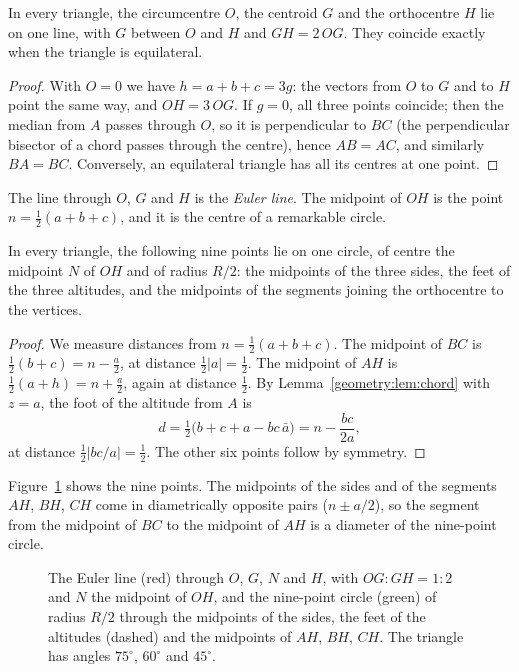 \begin{theorem}[Euler, 1765]\label{geometry:thm:eulerline}
In every triangle, the circumcentre $O$, the centroid $G$ and the orthocentre $H$ lie on one line, with $G$ between $O$ and $H$ and
$GH=2\,OG$. They coincide exactly when the triangle is equilateral.
\end{theorem}
\begin{proof}
With $O=0$ we have $h=a+b+c=3g$: the vectors from $O$ to $G$ and to $H$ point the same way, and $OH=3\,OG$. If $g=0$, all three
points coincide; then the median from $A$ passes through $O$, so it is perpendicular to $BC$ (the perpendicular bisector of a chord
passes through the centre), hence $AB=AC$, and similarly $BA=BC$. Conversely, an equilateral triangle has all its centres at one point.
\end{proof}

The line through $O$, $G$ and $H$ is the \emph{Euler line}. The midpoint of $OH$ is the point $n=\frac12(a+b+c)$, and it is the centre
of a remarkable circle.

\begin{theorem}\label{geometry:thm:ninepoint}
In every triangle, the following nine points lie on one circle, of centre the midpoint $N$ of $OH$ and of radius $R/2$: the midpoints of
the three sides, the feet of the three altitudes, and the midpoints of the segments joining the orthocentre to the vertices.
\end{theorem}
\begin{proof}
We measure distances from $n=\frac12(a+b+c)$. The midpoint of $BC$ is $\frac12(b+c)=n-\frac a2$, at distance $\frac12|a|=\frac12$.
The midpoint of $AH$ is $\frac12(a+h)=n+\frac a2$, again at distance $\frac12$. By Lemma~\ref{geometry:lem:chord} with $z=a$, the foot of the
altitude from $A$ is
\[
d=\tfrac12\bigl(b+c+a-bc\,\bar a\bigr)=n-\frac{bc}{2a},
\]
at distance $\frac12|bc/a|=\frac12$. The other six points follow by symmetry.
\end{proof}

Figure~\ref{geometry:fig:euler} shows the nine points. The midpoints of the sides and of the segments $AH$, $BH$, $CH$ come in diametrically
opposite pairs ($n\pm a/2$), so the segment from the midpoint of $BC$ to the midpoint of $AH$ is a diameter of the nine-point circle.

\begin{figure}[ht]
\centering
{}
\caption{The Euler line (red) through $O$, $G$, $N$ and $H$, with $OG:GH=1:2$ and $N$ the midpoint of $OH$, and the nine-point circle
(green) of radius $R/2$ through the midpoints of the sides, the feet of the altitudes (dashed) and the midpoints of $AH$, $BH$, $CH$.
The triangle has angles $75^\circ$, $60^\circ$ and $45^\circ$.}
\label{geometry:fig:euler}
\end{figure}

